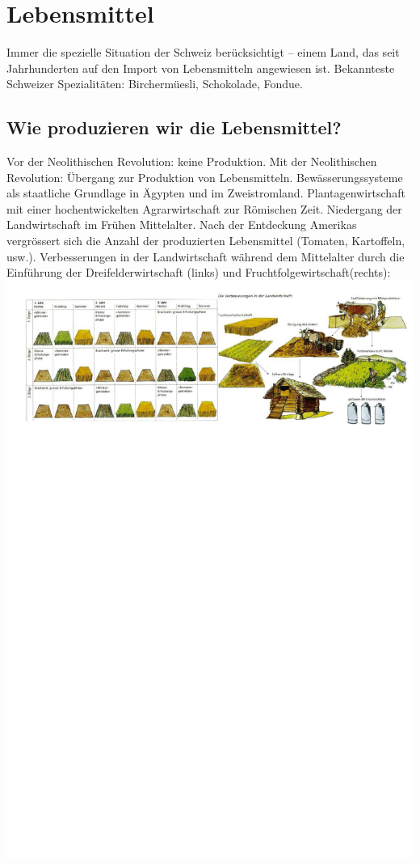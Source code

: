 \documentclass[10pt, openright=true]{scrartcl}
\begin{document}
\section{Lebensmittel}
Immer die spezielle Situation der Schweiz berücksichtigt – einem Land, das seit Jahrhunderten auf den Import von Lebensmitteln angewiesen ist. Bekannteste Schweizer Spezialitäten: Birchermüesli, Schokolade, Fondue.
\subsection{Wie produzieren wir die Lebensmittel?}
Vor der Neolithischen Revolution: keine Produktion. Mit der Neolithischen Revolution: Übergang zur Produktion von Lebensmitteln. Bewässerungssysteme als staatliche Grundlage in Ägypten und im Zweistromland. Plantagenwirtschaft mit einer hochentwickelten Agrarwirtschaft zur Römischen Zeit. Niedergang der Landwirtschaft im Frühen Mittelalter. Nach der Entdeckung Amerikas vergrössert sich die Anzahl der produzierten Lebensmittel (Tomaten, Kartoffeln, usw.). Verbesserungen in der Landwirtschaft während dem Mittelalter durch die Einführung der Dreifelderwirtschaft (links) und Fruchtfolgewirtschaft(rechts):\\
\includegraphics[width=1\textwidth]{images/felderwirtschaft}
\end{document}
